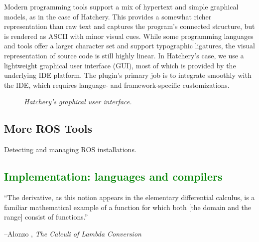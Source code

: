 \documentclass[12pt,initial,twoside,maitrise]{dms}
\newcommand{\mediumwell}[1]{\textcolor{green}{#1}}
\numberwithin{equation}{section}
\numberwithin{table}{chapter}
\numberwithin{figure}{chapter}
\begin{document}
Modern programming tools support a mix of hypertext and simple graphical models, as in the case of Hatchery. This provides a somewhat richer representation than raw text and captures the program's connected structure, but is rendered as ASCII with minor visual cues. While some programming languages and tools offer a larger character set and support typographic ligatures, the visual representation of source code is still highly linear. In Hatchery's case, we use a lightweight graphical user interface (GUI), most of which is provided by the underlying IDE platform. The plugin's primary job is to integrate smoothly with the IDE, which requires language- and framework-specific customizations.

\begin{figure}
    \centering
    \caption{\textit{Hatchery's graphical user interface.}}
    \label{fig:hatchery_gui}
\end{figure}

\section{More ROS Tools}

Detecting and managing ROS installations.

\mediumwell{\chapter{Implementation: languages and compilers}\label{ch:kotlingrad}}

\setlength{\epigraphwidth}{0.7\textwidth}
\epigraph{``The derivative, as this notion appears in the elementary differential calculus, is a familiar mathematical example of a function for which both [the domain and the range] consist of functions.''}{\begin{flushright}--Alonzo \citet{church1985calculi}, \textit{The Calculi of Lambda Conversion}\end{flushright}}
\end{document}
